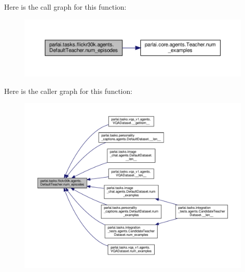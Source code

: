 Here is the call graph for this function\+:
\nopagebreak
\begin{figure}[H]
\begin{center}
\leavevmode
\includegraphics[width=350pt]{classparlai_1_1tasks_1_1flickr30k_1_1agents_1_1DefaultTeacher_a0711151a8588c499abdda943b27793a8_cgraph}
\end{center}
\end{figure}
Here is the caller graph for this function\+:
\nopagebreak
\begin{figure}[H]
\begin{center}
\leavevmode
\includegraphics[width=350pt]{classparlai_1_1tasks_1_1flickr30k_1_1agents_1_1DefaultTeacher_a0711151a8588c499abdda943b27793a8_icgraph}
\end{center}
\end{figure}
\mbox{\label{classparlai_1_1tasks_1_1flickr30k_1_1agents_1_1DefaultTeacher_a58f86f4eb5a109d5c2a9034d701d452c}} 
